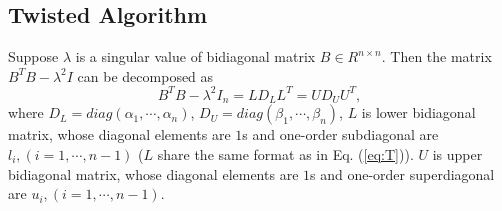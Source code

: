 \vspace{-0.1in}
\subsection{Twisted Algorithm}
\vspace{-0.1in}

Suppose $\lambda$ is a singular value of bidiagonal matrix $B \in R^{n \times n}$.
Then the matrix $B^T B - \lambda^2 I$ can be decomposed as
\begin{equation}
B^T B - \lambda^2 I_n = L D_L L^T = U D_U U^T ,
\end{equation}
where $D_L=diag(\alpha_1, \cdots, \alpha_n)$, $D_U = diag(\beta_1, \cdots, \beta_n)$, 
$L$ is lower bidiagonal matrix, whose diagonal elements are $1$s and one-order subdiagonal are $l_{i}, (i=1,\cdots,n-1)$ ($L$ share the same format as in Eq. (\ref{eq:T})).
$U$ is upper bidiagonal matrix, whose diagonal elements are $1$s and one-order superdiagonal are $u_{i}, (i=1,\cdots,n-1)$. 

